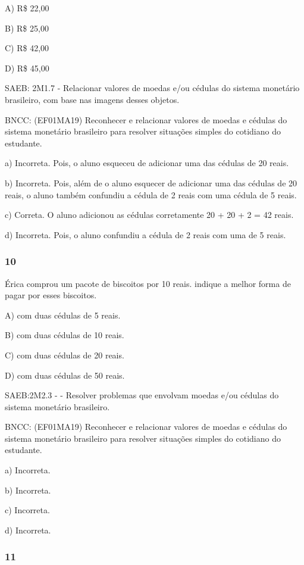 A) R\$ 22,00

B) R\$ 25,00

C) R\$ 42,00

D) R\$ 45,00

SAEB: 2M1.7 - Relacionar valores de moedas e/ou cédulas do sistema
monetário brasileiro, com base nas imagens desses objetos.

BNCC: (EF01MA19) Reconhecer e relacionar valores de moedas e cédulas do
sistema monetário brasileiro para resolver situações simples do
cotidiano do estudante.

a) Incorreta. Pois, o aluno esqueceu de adicionar uma das cédulas de 20
reais.

b) Incorreta. Pois, além de o aluno esquecer de adicionar uma das
cédulas de 20 reais, o aluno também confundiu a cédula de 2 reais com
uma cédula de 5 reais.

c) Correta. O aluno adicionou as cédulas corretamente 20 + 20 + 2 = 42
reais.

d) Incorreta. Pois, o aluno confundiu a cédula de 2 reais com uma de 5
reais.

\subsubsection{10}\label{section-96}

Érica comprou um pacote de biscoitos por 10 reais. indique a melhor
forma de pagar por esses biscoitos.

A) com duas cédulas de 5 reais.

B) com duas cédulas de 10 reais.

C) com duas cédulas de 20 reais.

D) com duas cédulas de 50 reais.

SAEB:2M2.3 - - Resolver problemas que envolvam moedas e/ou cédulas do
sistema monetário brasileiro.

BNCC: (EF01MA19) Reconhecer e relacionar valores de moedas e cédulas do
sistema monetário brasileiro para resolver situações simples do
cotidiano do estudante.

a) Incorreta.

b) Incorreta.

c) Incorreta.

d) Incorreta.

\subsubsection{11}\label{section-97}

